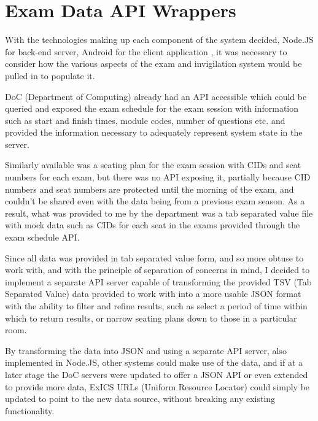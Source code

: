 \chapter{Exam Data API Wrappers}

\label{ch:apiwrappers}

With the technologies making up each component of the system decided, Node.JS for back-end server, Android for the client application , it was necessary to consider how the various aspects of the exam and invigilation system would be pulled in to populate it.

DoC (Department of Computing) already had an API accessible which could be queried and exposed the exam schedule for the exam session with information such as start and finish times, module codes, number of questions etc. and provided the information necessary to adequately represent system state in the server.

Similarly available was a seating plan for the exam session with CIDs and seat numbers for each exam, but there was no API exposing it, partially because CID numbers and seat numbers are protected until the morning of the exam, and couldn't be shared even with the data being from a previous exam season.  As a result, what was provided to me by the department was a tab separated value file with mock data such as CIDs for each seat in the exams provided through the exam schedule API.

Since all data was provided in tab separated value form, and so more obtuse to work with, and with the principle of separation of concerns \cite{sepofconcerns} in mind, I decided to implement a separate API server capable of transforming the provided TSV (Tab Separated Value) data provided to work with into a more usable JSON format with the ability to filter and refine results, such as select a period of time within which to return results, or narrow seating plans down to those in a particular room.

By transforming the data into JSON and using a separate API server, also implemented in Node.JS, other systems could make use of the data, and if at a later stage the DoC servers were updated to offer a JSON API or even extended to provide more data, ExICS URLs (Uniform Resource Locator) could simply be updated to point to the new data source, without breaking any existing functionality.